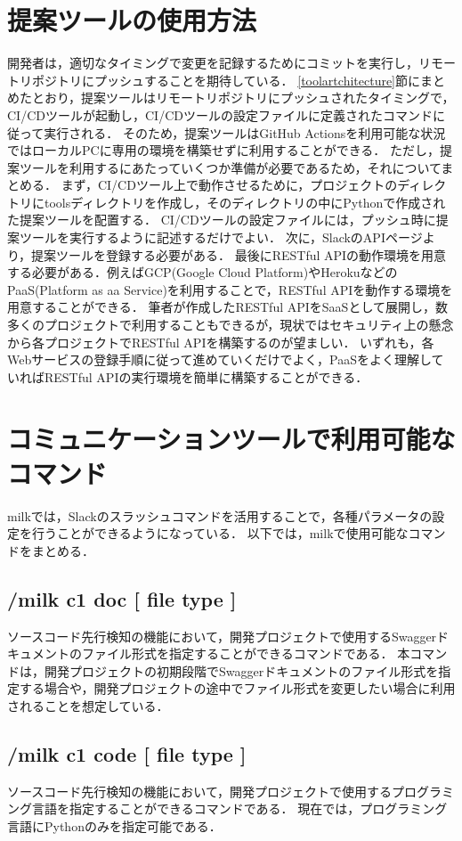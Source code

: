 \section{提案ツールの使用方法}
開発者は，適切なタイミングで変更を記録するためにコミットを実行し，リモートリポジトリにプッシュすることを期待している．
\ref{toolartchitecture}節にまとめたとおり，提案ツールはリモートリポジトリにプッシュされたタイミングで，CI/CDツールが起動し，CI/CDツールの設定ファイルに定義されたコマンドに従って実行される．
そのため，提案ツールはGitHub Actionsを利用可能な状況ではローカルPCに専用の環境を構築せずに利用することができる．
ただし，提案ツールを利用するにあたっていくつか準備が必要であるため，それについてまとめる．
まず，CI/CDツール上で動作させるために，プロジェクトのディレクトリにtoolsディレクトリを作成し，そのディレクトリの中にPythonで作成された提案ツールを配置する．
CI/CDツールの設定ファイルには，プッシュ時に提案ツールを実行するように記述するだけでよい．
次に，SlackのAPIページより，提案ツールを登録する必要がある．
最後にRESTful APIの動作環境を用意する必要がある．例えばGCP(Google Cloud Platform)\cite{gcp}やHeroku\cite{heroku}などのPaaS(Platform as aa Service)を利用することで，RESTful APIを動作する環境を用意することができる．
筆者が作成したRESTful APIをSaaSとして展開し，数多くのプロジェクトで利用することもできるが，現状ではセキュリティ上の懸念から各プロジェクトでRESTful APIを構築するのが望ましい．
いずれも，各Webサービスの登録手順に従って進めていくだけでよく，PaaSをよく理解していればRESTful APIの実行環境を簡単に構築することができる．

\section{コミュニケーションツールで利用可能なコマンド}
milkでは，Slackのスラッシュコマンドを活用することで，各種パラメータの設定を行うことができるようになっている．
以下では，milkで使用可能なコマンドをまとめる．

\subsection*{/milk c1 doc [ file type ]}
ソースコード先行検知の機能において，開発プロジェクトで使用するSwaggerドキュメントのファイル形式を指定することができるコマンドである．
本コマンドは，開発プロジェクトの初期段階でSwaggerドキュメントのファイル形式を指定する場合や，開発プロジェクトの途中でファイル形式を変更したい場合に利用されることを想定している．

\subsection*{/milk c1 code [ file type ]}
ソースコード先行検知の機能において，開発プロジェクトで使用するプログラミング言語を指定することができるコマンドである．
現在では，プログラミング言語にPythonのみを指定可能である．

